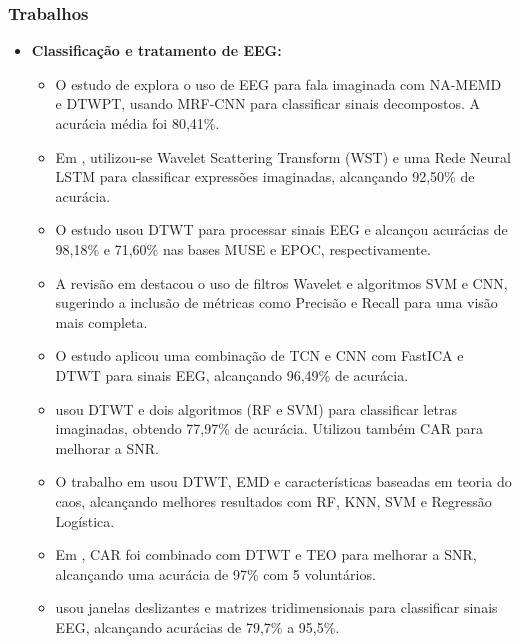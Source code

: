 \begin{frame}[allowframebreaks]
	\frametitle{Trabalhos}
	\begin{itemize}
		
		\item \textbf{Classificação e tratamento de EEG:} \begin{itemize}
			\item O estudo de \cite{ParkHyeong-jun2023Mcoi} explora o uso de EEG para fala imaginada com NA-MEMD e DTWPT, usando MRF-CNN para classificar sinais decompostos. A acurácia média foi 80,41\%.
			
			\item Em \cite{AbdulghaniMokhlesM2023ISCU}, utilizou-se Wavelet Scattering Transform (WST) e uma Rede Neural LSTM para classificar expressões imaginadas, alcançando 92,50\% de acurácia.
			
			\item O estudo \cite{MahapatraNrushinghCharan2023Ecoi} usou DTWT para processar sinais EEG e alcançou acurácias de 98,18\% e 71,60\% nas bases MUSE e EPOC, respectivamente.
			
			\item A revisão em \cite{ShahUzair2022TRoA} destacou o uso de filtros Wavelet e algoritmos SVM e CNN, sugerindo a inclusão de métricas como Precisão e Recall para uma visão mais completa.
			
			\item O estudo \cite{MahapatraNrushinghCharan2022MCoI} aplicou uma combinação de TCN e CNN com FastICA e DTWT para sinais EEG, alcançando 96,49\% de acurácia.
			
			\item \cite{AgarwalPrabhakar2022Ebia} usou DTWT e dois algoritmos (RF e SVM) para classificar letras imaginadas, obtendo 77,97\% de acurácia. Utilizou também CAR para melhorar a SNR.
			
			\item O trabalho em \cite{Hernandez-Del-ToroTonatiuh2021TaEB} usou DTWT, EMD e características baseadas em teoria do caos, alcançando melhores resultados com RF, KNN, SVM e Regressão Logística.
			
			\item Em \cite{MOCTEZUMA2019201}, CAR foi combinado com DTWT e TEO para melhorar a SNR, alcançando uma acurácia de 97\% com 5 voluntários.
			
			\item \cite{PanachakelJerrinRamakrishnan} usou janelas deslizantes e matrizes tridimensionais para classificar sinais EEG, alcançando acurácias de 79,7\% a 95,5\%.
			

\end{itemize}
\end{itemize}
\end{frame}
